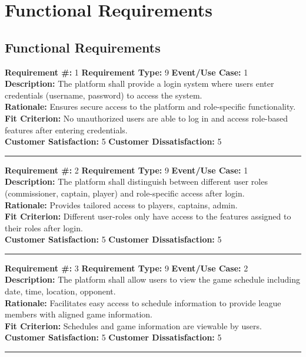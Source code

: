 \documentclass[12pt]{article}
\begin{document}
\section{Functional Requirements}
\subsection{Functional Requirements}
\textbf{Requirement \#:} 1 \quad \textbf{Requirement Type:} 9 \quad \textbf{Event/Use Case:} 1 \\
\textbf{Description:} The platform shall provide a login system where users enter credentials (username, password) to access the system.\\
\textbf{Rationale:} Ensures secure access to the platform and role-specific functionality.\\
\textbf{Fit Criterion:} No unauthorized users are able to log in and access role-based features after entering credentials.\\
\textbf{Customer Satisfaction:} 5 \quad\quad \textbf{Customer Dissatisfaction:} 5 \\
\noindent\rule{\textwidth}{1pt}

\textbf{Requirement \#:} 2 \quad \textbf{Requirement Type:} 9 \quad \textbf{Event/Use Case:} 1 \\
\textbf{Description:} The platform shall distinguish between different user roles (commissioner, captain, player) and role-specific access after login.\\
\textbf{Rationale:}  Provides tailored access to players, captains, admin.\\
\textbf{Fit Criterion:} Different user-roles only have access to the features assigned to their roles after login.\\
\textbf{Customer Satisfaction:} 5 \quad\quad \textbf{Customer Dissatisfaction:} 5 \\
\noindent\rule{\textwidth}{1pt}

\textbf{Requirement \#:} 3 \quad \textbf{Requirement Type:} 9 \quad \textbf{Event/Use Case:} 2 \\
\textbf{Description:} The platform shall allow users to view the game schedule including date, time, location, opponent.\\
\textbf{Rationale:} Facilitates easy access to schedule information to provide league members with aligned game information.\\
\textbf{Fit Criterion:} Schedules and game information are viewable by users.\\
\textbf{Customer Satisfaction:} 5 \quad\quad \textbf{Customer Dissatisfaction:} 5\\
\noindent\rule{\textwidth}{1pt}
\end{document}

